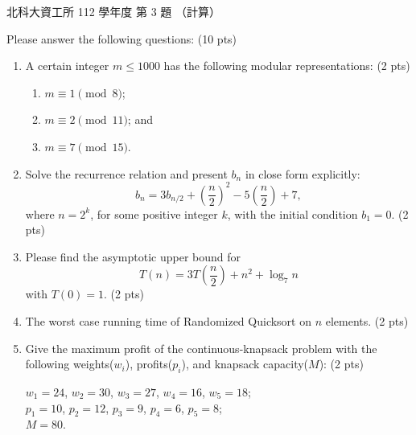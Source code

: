 \begin{pastexam}[label={px:ntut-112-ci-03}]{北科大資工所 112 學年度 第 3 題}
（計算）

Please answer the following questions: (10 pts)
\begin{enumerate}[label=(\arabic*)]
\item A certain integer $m\le1000$ has the following modular representations: (2 pts)
\begin{enumerate}[label=\roman*.]
\item $m\equiv1\pmod 8$;
\item $m\equiv2\pmod{11}$; and
\item $m\equiv7\pmod{15}$.
\end{enumerate}
\item Solve the recurrence relation and present $b_n$ in close form explicitly:
\[b_n=3b_{n/2}+\left(\frac{n}{2}\right)^2-5\left(\frac{n}{2}\right)+7,\]
where $n=2^k$, for some positive integer $k$, with the initial condition $b_1=0$. (2 pts)
\item Please find the asymptotic upper bound for
\[T(n)=3T\left(\frac{n}{2}\right)+n^2+\log_7 n\]
with $T(0)=1$. (2 pts)
\item The worst case running time of Randomized Quicksort on $n$ elements. (2 pts)
\item Give the maximum profit of the continuous-knapsack problem with the following weights($w_i$), profits($p_i$), and knapsack capacity($M$): (2 pts)
\begin{center}
$w_1=24$, $w_2=30$, $w_3=27$, $w_4=16$, $w_5=18$;\\
$p_1=10$, $p_2=12$, $p_3=9$, $p_4=6$, $p_5=8$;\\
$M=80$.
\end{center}
\end{enumerate}
\end{pastexam}

